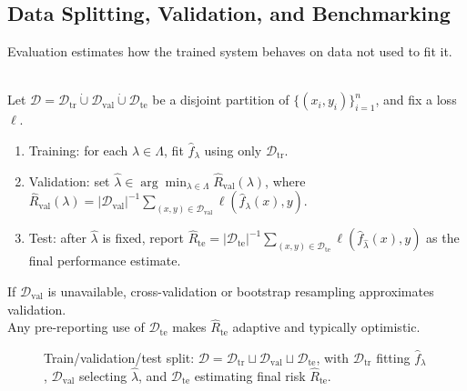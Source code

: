 \subsection{Data Splitting, Validation, and Benchmarking}

Evaluation estimates how the trained system behaves on data not used to fit it.

\begin{definition} \label{def:sl-train-validation-test} \\
Let $\mathcal{D}=\mathcal{D}_{\mathrm{tr}}\dot\cup\mathcal{D}_{\mathrm{val}}\dot\cup\mathcal{D}_{\mathrm{te}}$ be a disjoint partition of $\{(x_i,y_i)\}_{i=1}^n$, and fix a loss $\ell$.
\begin{enumerate}[label=(\roman*)]
\setlength{\itemsep}{0pt}
\item Training: for each $\lambda\in\Lambda$, fit $\widehat f_\lambda$ using only $\mathcal{D}_{\mathrm{tr}}$.
\item Validation: set $\widehat\lambda\in\arg\min_{\lambda\in\Lambda}\widehat R_{\mathrm{val}}(\lambda)$, where $\widehat R_{\mathrm{val}}(\lambda)=|\mathcal{D}_{\mathrm{val}}|^{-1}\sum_{(x,y)\in\mathcal{D}_{\mathrm{val}}}\ell(\widehat f_\lambda(x),y)$.
\item Test: after $\widehat\lambda$ is fixed, report $\widehat R_{\mathrm{te}}=|\mathcal{D}_{\mathrm{te}}|^{-1}\sum_{(x,y)\in\mathcal{D}_{\mathrm{te}}}\ell(\widehat f_{\widehat\lambda}(x),y)$ as the final performance estimate.
\end{enumerate}
If $\mathcal{D}_{\mathrm{val}}$ is unavailable, cross-validation or bootstrap resampling approximates validation.\\
Any pre-reporting use of $\mathcal{D}_{\mathrm{te}}$ makes $\widehat R_{\mathrm{te}}$ adaptive and typically optimistic.
\end{definition}

\begin{figure}[H]
  \centering
  
  \caption[Train/validation/test split]{Train/validation/test split: $\mathcal D=\mathcal D_{\mathrm{tr}}\sqcup\mathcal D_{\mathrm{val}}\sqcup\mathcal D_{\mathrm{te}}$, with $\mathcal D_{\mathrm{tr}}$ fitting $\widehat{f}_\lambda$, $\mathcal D_{\mathrm{val}}$ selecting $\widehat{\lambda}$, and $\mathcal D_{\mathrm{te}}$ estimating final risk $\widehat{R}_{\mathrm{te}}$.}
  \label{fig:sl-train-validation-test-split}
\end{figure}

